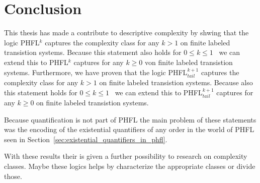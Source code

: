 \chapter{Conclusion}

This thesis has made a contribute to descriptive complexity by shwing that the logic PHFL$^k$ captures the complexity class  for any $k > 1$ on finite labeled transistion systems. Because this statement also holds for $0 \leq k \leq 1$~\cite{lange2014capturing} we can extend this to PHFL$^k$ captures  for any $k \geq 0$ von finite labeled transistion systems. Furthermore, we have proven that the logic PHFL$^{k+1}_{tail}$ captures the complexity class  for any $k > 1$ on finite labeled transistion systems. Because also this statement holds for $0 \leq k \leq 1$~\cite{lange2014capturing} we can extend this to PHFL$^{k+1}_{tail}$ captures  for any $k \geq 0$ on finite labeled transistion systems.

Because quantification is not part of PHFL the main problem of these statements was the encoding of the existential quantifiers of any order in the world of PHFL seen in Section~\ref{sec:existential_quantifiers_in_phfl}. 

With these results their is given a further possibility to research on complexity classes. Maybe these logics helps by characterize the appropriate classes or divide those.

%
